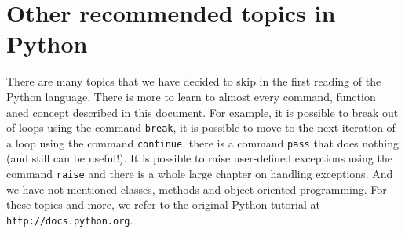 \section{Other recommended topics in Python} \label{sec:adv}

There are many topics that we have decided to skip in the first reading 
of the Python language. There is more to learn to almost every command,
function aned concept described in this document. For example, it is possible
to break out of loops using the command {\tt break}, it is possible to 
move to the next iteration of a loop using the command {\tt continue},
there is a command {\tt pass} that does nothing (and still can be useful!). 
It is possible to 
raise user-defined exceptions using the command {\tt raise} and there
is a whole large chapter on handling exceptions. And we have not 
mentioned classes, methods and object-oriented programming. For these
topics and more, we refer to the original Python tutorial at 
{\tt http://docs.python.org}. 





